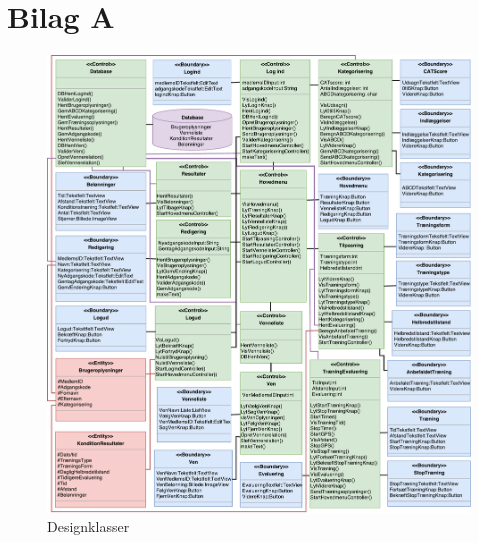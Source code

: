 \section{Bilag A} \label{sec:bilagA}


\begin{figure} [H]
\centering
\includegraphics[width=1\textwidth]{figures/MVC/Designklasse}
\caption{Designklasser}
\label{fig:Designklasser}
\end{figure}